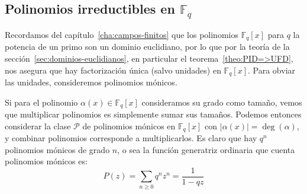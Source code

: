 %

\subsection{Polinomios irreductibles en \(\mathbb{F}_q\)}
\label{sec:count-irreductible-polynomials}

  Recordamos del capítulo~\ref{cha:campos-finitos}
  que los polinomios
  \(\mathbb{F}_q[x]\) para \(q\) la potencia de un primo
  son un dominio euclidiano,
  por lo que
  por la teoría de la sección~\ref{sec:dominios-euclidianos},
  en particular el teorema~\ref{theo:PID=>UFD},
  nos asegura que hay factorización única
  (salvo unidades)
  en \(\mathbb{F}_q[x]\).
  Para obviar las unidades,
  consideremos polinomios mónicos.

  Si para el polinomio \(\alpha(x) \in \mathbb{F}_q[x]\)
  consideramos su grado como tamaño,
  vemos que multiplicar polinomios es simplemente sumar sus tamaños.
  Podemos entonces considerar
  la clase \(\mathcal{P}\)
  de polinomios mónicos en \(\mathbb{F}_q[x]\)
  con \(\lvert \alpha(x) \rvert = \deg(\alpha)\),
  y combinar polinomios corresponde a multiplicarlos.
  Es claro que hay \(q^n\) polinomios mónicos de grado \(n\),
  o sea la función generatriz ordinaria
  que cuenta polinomios mónicos es:
  \begin{equation*}
    P(z)
      = \sum_{n \ge 0} q^n z^n
      = \frac{1}{1 - q z}
  \end{equation*}


